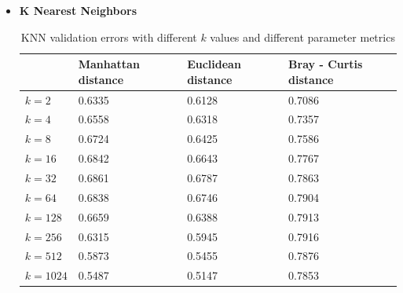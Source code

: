 \begin{itemize}
    \begin{itemize}
    \item \textbf{K Nearest Neighbors}
    \begin{table}[H]
\centering
\caption{KNN validation errors with different $k$ values and different parameter metrics}
\label{knn}
\begin{tabular}{l|l|l|l|}
\cline{2-4}
                               & Manhattan distance & Euclidean distance & Bray - Curtis distance \\ \hline
\multicolumn{1}{|l|}{$k=2$} & 0.6335 & 0.6128 & 0.7086 \\ \hline
\multicolumn{1}{|l|}{$k=4$} & 0.6558 & 0.6318 & 0.7357 \\ \hline
\multicolumn{1}{|l|}{$k=8$} & 0.6724 & 0.6425 & 0.7586 \\ \hline
\multicolumn{1}{|l|}{$k=16$} & 0.6842 & 0.6643 & 0.7767 \\ \hline
\multicolumn{1}{|l|}{$k=32$} & 0.6861 & 0.6787 & 0.7863 \\ \hline
\multicolumn{1}{|l|}{$k=64$} & 0.6838 & 0.6746 & 0.7904 \\ \hline
\multicolumn{1}{|l|}{$k=128$} & 0.6659 & 0.6388 & 0.7913 \\ \hline
\multicolumn{1}{|l|}{$k=256$} & 0.6315 & 0.5945 & 0.7916 \\ \hline
\multicolumn{1}{|l|}{$k=512$} & 0.5873 & 0.5455 & 0.7876 \\ \hline
\multicolumn{1}{|l|}{$k=1024$} & 0.5487 & 0.5147 & 0.7853 \\ \hline

\end{tabular}
\end{table}


\end{itemize}
\end{itemize}
